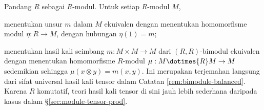 Pandang $R$ sebagai $R$-modul. Untuk setiap $R$-modul $M$,
\begin{inparaenum}[(i)]
	\item menentukan unsur $m$ dalam $M$ ekuivalen dengan menentukan homomorfisme modul $\eta: R \to M$, dengan hubungan $\eta(1) = m$;
	\item menentukan hasil kali seimbang $m: M \times M \to M$ dari $(R,R)$-bimodul ekuivalen dengan menentukan homomorfisme $R$-modul $\mu: M \dotimes{R} M \to M$ sedemikian sehingga $\mu(x \otimes y) = m(x,y)$. Ini merupakan terjemahan langsung dari sifat universal hasil kali tensor dalam Catatan \ref{rem:bimodule-balanced}. Karena $R$ komutatif, teori hasil kali tensor di sini jauh lebih sederhana daripada kasus dalam \S\ref{sec:module-tensor-prod}.
\end{inparaenum}

